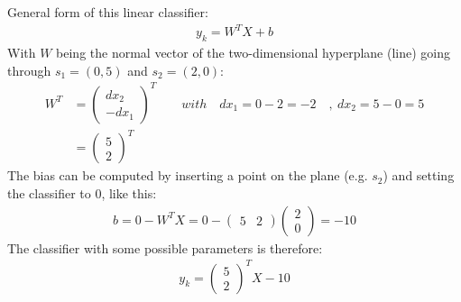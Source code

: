 \documentclass[11pt]{article}
\newcommand{\exercise}{\section{}}
\begin{document}
\exercise
\begin{center}
\end{center}
General form of this linear classifier:
\begin{align*}
	y_k = W^T X + b
\end{align*}
With $W$ being the normal vector of the two-dimensional hyperplane (line) going through $s_1=(0,5)$ and $s_2=(2,0)$:
\begin{align*}
	W^T &= 
	\begin{pmatrix}
	dx_2\\-dx_1
	\end{pmatrix}^T
	\quad\quad with\quad dx_1 = 0 - 2 = -2\quad,\ dx_2= 5-0 = 5\\
	&= 
	\begin{pmatrix}
	5\\2
	\end{pmatrix}^T
\end{align*}
The bias can be computed by inserting a point on the plane (e.g. $s_2$) and setting the classifier to $0$, like this:
\begin{align*}
	b = 0 - W^T X = 0 - 
	\begin{pmatrix}
	5 & 2
	\end{pmatrix}
	\begin{pmatrix}
	2\\0
	\end{pmatrix}
	= -10
\end{align*}
The classifier with some possible parameters is therefore:
\begin{align*}
	y_k = 
	\begin{pmatrix}
	5\\2
	\end{pmatrix}^T 
	X - 10
\end{align*}

\pagebreak

%	    
		
\end{document}
